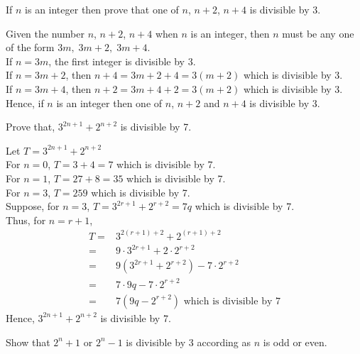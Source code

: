 \documentclass[12pt,class=book,crop=false]{standalone}
\begin{document}
\begin{qn}
    If $ n $ is an integer then prove that one of $ n $, $ n+2 $, $ n+4 $ is divisible by 3.
\end{qn}
\begin{soln}
    Given the number $ n $, $ n+2 $, $ n+4 $ when $ n  $ is an integer, then $ n $ must be any one of the form $ 3m,\;3m+2,\;3m+4 $.\\
    If $ n=3m $, the first integer is divisible by 3.\\
    If $ n=3m+2 $, then $ n+4=3m+2+4=3(m+2) $ which is divisible by 3.\\
    If $ n=3m+4 $, then $ n+2=3m+4+2=3(m+2) $ which is divisible by 3.\\
    Hence, if $ n $ is an integer then one of $ n $, $ n+2 $ and $ n+4 $ is divisible by 3.
\end{soln}
\begin{qn}
    Prove that, $ 3^{2n+1}+2^{n+2} $ is divisible by 7.
\end{qn}
\begin{soln}
    Let $ T=3^{2n+1}+2^{n+2} $\\
    For $ n=0 $, $ T=3+4=7 $ which is divisible by 7.\\
    For $ n=1 $, $ T=27+8=35 $ which is divisible by 7.\\
    For $ n=3 $, $ T=259 $ which is divisible by 7.\\
    Suppose, for $ n=3 $, $ T=3^{2r+1}+2^{r+2}=7q $ which is divisible by 7.\\
    Thus, for $ n=r+1 $,
    \begin{align*}
        T= & 3^{2(r+1)+2}+2^{(r+1)+2}                                \\
        =  & 9\cdot3^{2r+1}+2\cdot2^{r+2}                            \\
        =  & 9\left(3^{2r+1}+2^{r+2}\right)-7\cdot2^{r+2}            \\
        =  & 7\cdot 9q-7\cdot 2^{r+2}                                \\
        =  & 7\left(9q-2^{r+2}\right)\text{ which is divisible by }7
    \end{align*}
    Hence, $ 3^{2n+1}+2^{n+2} $ is divisible by 7.
\end{soln}
\begin{qn}
    Show that $ 2^n+1 $ or $ 2^n-1 $ is divisible by 3 according as $ n $ is odd or even.
\end{qn}
\end{document}
